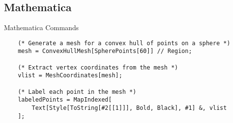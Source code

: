 \subsection{Mathematica}
\renewcommand{\listingFontSize}{\tiny} 
\begin{frame}{Mathematica Commands}
    \lstset{style=mathematica} %
    
    \begin{lstlisting}
    (* Generate a mesh for a convex hull of points on a sphere *)
    mesh = ConvexHullMesh[SpherePoints[60]] // Region;

    (* Extract vertex coordinates from the mesh *)
    vlist = MeshCoordinates[mesh];

    (* Label each point in the mesh *)
    labeledPoints = MapIndexed[
        Text[Style[ToString[#2[[1]]], Bold, Black], #1] &, vlist
    ];
    \end{lstlisting}
\end{frame}

\endinput  %